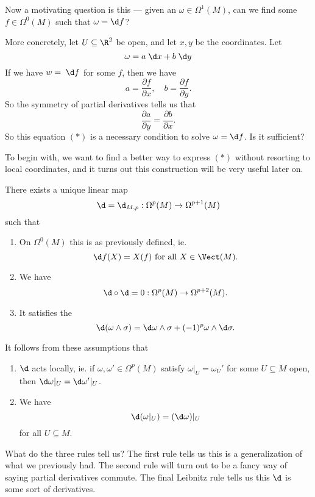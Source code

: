 \documentclass[a4paper]{article}
\begin{document}
Now a motivating question is this --- given an $\omega \in \Omega^1(M)$, can we find some $f \in \Omega^0(M)$ such that $\omega = \d f$?

More concretely, let $U \subseteq \R^2$ be open, and let $x, y$ be the coordinates. Let
\[
  \omega = a \;\d x + b\;\d y
\]
If we have $w = \;\d f$ for some $f$, then we have
\[
  a = \frac{\partial f}{\partial x},\quad b = \frac{\partial f}{\partial y}.
\]
So the symmetry of partial derivatives tells us that
\[
  \frac{\partial a}{\partial y} = \frac{\partial b}{\partial x}.\tag{$*$}
\]
So this equation $(*)$ is a necessary condition to solve $\omega = \d f$. Is it sufficient?

To begin with, we want to find a better way to express $(*)$ without resorting to local coordinates, and it turns out this construction will be very useful later on.
\begin{thm}
  There exists a unique linear map
  \[
    \d = \d_{M, p}: \Omega^p(M) \to \Omega^{p + 1}(M)
  \]
  such that
  \begin{enumerate}
    \item On $\Omega^0(M)$ this is as previously defined, ie.
      \[
        \d f (X) = X(f)\text{ for all }X \in \Vect(M).
      \]
    \item We have
      \[
        \d \circ \d = 0: \Omega^p(M) \to \Omega^{p + 2}(M).
      \]
    \item It satisfies the 
      \[
        \d (\omega \wedge \sigma) = \d \omega \wedge \sigma + (-1)^p \omega \wedge \d \sigma.
      \]
  \end{enumerate}
  It follows from these assumptions that
  \begin{enumerate}[resume]
    \item $\d$ acts locally, ie. if $\omega, \omega' \in \Omega^p(M)$ satisfy $\omega|_U = \omega_U'$ for some $U \subseteq M$ open, then $\d \omega|_U = \d \omega'|_U$.
    \item We have
      \[
        \d (\omega|_U) = (\d \omega)|_U
      \]
      for all $U \subseteq M$.
  \end{enumerate}
\end{thm}
What do the three rules tell us? The first rule tells us this is a generalization of what we previously had. The second rule will turn out to be a fancy way of saying partial derivatives commute. The final Leibnitz rule tells us this $\d$ is some sort of derivatives.
\end{document}
